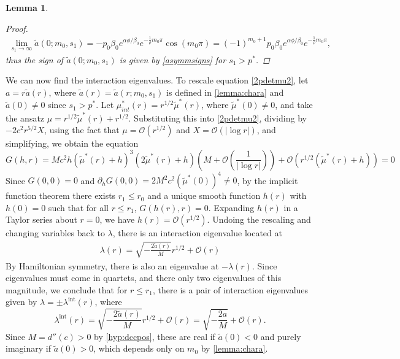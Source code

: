 \documentclass[10pt,reqno]{amsart}
\theoremstyle{plain}
\newtheorem{lemma}[theorem]{Lemma}
\theoremstyle{definition}
\theoremstyle{remark}
\numberwithin{theorem}{section}
\numberwithin{equation}{section}
\begin{document}
\begin{lemma}
\begin{proof}
\begin{align*}
\lim_{s_1 \rightarrow \infty}
\tilde{a}(0; m_0, s_1) = -p_0 \beta_0 e^{\alpha \phi/\beta_0} e^{-\frac{1}{\rho} m_0 \pi} \cos(m_0 \pi) = (-1)^{m_0+1} p_0 \beta_0 e^{\alpha \phi/\beta_0} e^{-\frac{1}{\rho} m_0 \pi},
\end{align*}
thus the sign of $\tilde{a}(0; m_0, s_1)$ is given by \cref{asymmsigns} for $s_1 > p^*$.
\end{proof}
\end{lemma}

We can now find the interaction eigenvalues. To rescale equation \cref{2pdetmu2}, let $a = r \tilde{a}(r)$, where $\tilde{a}(r) = \tilde{a}(r; m_0, s_1)$ is defined in \cref{lemma:chara} and $\tilde{a}(0) \neq 0$ since $s_1 > p^*$. Let $\mu^*_{int}(r) = r^{1/2} \tilde{\mu}^*(r)$, where $\tilde{\mu}^*(0) \neq 0$, and take the ansatz $\mu = r^{1/2} \tilde{\mu}^*(r) + r^{1/2}$. Substituting this into \cref{2pdetmu2}, dividing by $-2 c^2 r^{5/2} X$, using the fact that $\mu = \mathcal{O}(r^{1/2})$ and $X = \mathcal{O}(|\log r|)$, and simplifying, we obtain the equation
\[
G(h, r) = M c^2 h (\tilde{\mu}^*(r) + h)^3 (2 \tilde{\mu}^*(r) + h)
\left( M + \mathcal{O}\left(\frac{1}{|\log r|} \right) \right)
 + \mathcal{O}\left( r^{1/2}(\tilde{\mu}^*(r) + h) \right) = 0
\]
Since $G(0, 0) = 0$ and $\partial_h G(0, 0) = 2 M^2 c^2 (\tilde{\mu}^*(0))^4 \neq 0$, by the implicit function theorem there exists $r_1 \leq r_0$ and a unique smooth function $h(r)$ with $h(0) = 0$ such that for all $r \leq r_1$, $G(h(r), r) = 0$. Expanding $h(r)$ in a Taylor series about $r = 0$, we have $h(r) = \mathcal{O}(r^{1/2})$. Undoing the rescaling and changing variables back to $\lambda$, there is an interaction eigenvalue located at 
\begin{align*}
\lambda(r) = \sqrt{-\frac{2 \tilde{a}(r)}{M}}r^{1/2} + \mathcal{O}(r)
\end{align*}
By Hamiltonian symmetry, there is also an eigenvalue at $-\lambda(r)$. Since eigenvalues must come in quartets, and there only two eigenvalues of this magnitude, we conclude that for $r \leq r_1$, there is a pair of interaction eigenvalues given by $\lambda = \pm \lambda^{\text{int}}(r)$, where
\[
\lambda^{\text{int}}(r) = \sqrt{ -\frac{2 \tilde{a}(r)}{M} }r^{1/2} + \mathcal{O}(r) 
= \sqrt{ -\frac{2 a}{M} } + \mathcal{O}(r).
\]
Since $M = d''(c) > 0$ by \cref{hyp:dccpos}, these are real if $\tilde{a}(0) < 0$ and purely imaginary if $\tilde{a}(0) > 0$, which depends only on $m_0$ by \cref{lemma:chara}.
\end{document}
